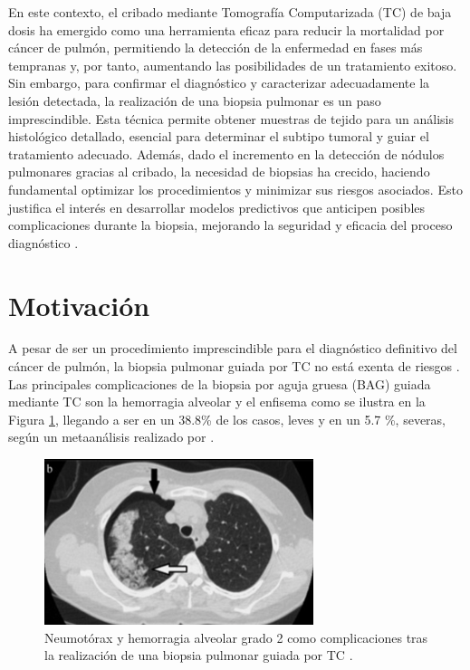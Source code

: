 En este contexto, el cribado mediante Tomografía Computarizada (TC) de baja dosis ha emergido como una herramienta eficaz para reducir la mortalidad por cáncer de pulmón, permitiendo la detección de la enfermedad en fases más tempranas y, por tanto, aumentando las posibilidades de un tratamiento exitoso. Sin embargo, para confirmar el diagnóstico y caracterizar adecuadamente la lesión detectada, la realización de una biopsia pulmonar es un paso imprescindible. Esta técnica permite obtener muestras de tejido para un análisis histológico detallado, esencial para determinar el subtipo tumoral y guiar el tratamiento adecuado. Además, dado el incremento en la detección de nódulos pulmonares gracias al cribado, la necesidad de biopsias ha crecido, haciendo fundamental optimizar los procedimientos y minimizar sus riesgos asociados. Esto justifica el interés en desarrollar modelos predictivos que anticipen posibles complicaciones durante la biopsia, mejorando la seguridad y eficacia del proceso diagnóstico \parencite{leiter2023global}.

\section{Motivación}

A pesar de ser un procedimiento imprescindible para el diagnóstico definitivo del cáncer de pulmón, la biopsia pulmonar guiada por TC no está exenta de riesgos \parencite{marel2021biopsy}. Las principales complicaciones de la biopsia por aguja gruesa (BAG) guiada mediante TC son la hemorragia alveolar y el enfisema \parencite{ccakir2020evaluation} como se ilustra en la Figura \ref{fig:complicaciones}, llegando a ser en un 38.8\% de los casos, leves y en un 5.7 \%, severas, según un metaanálisis realizado por \cite{heerink2017complication}.

\begin{figure}[!htbp]
    \centering
    \includegraphics[width=0.7\textwidth]{img/complicacion.png}
    \caption{Neumotórax y hemorragia alveolar grado 2 como complicaciones tras la realización de una biopsia pulmonar guiada por TC \parencite{elshafee2019complications}.}
    \label{fig:complicaciones}
\end{figure}

